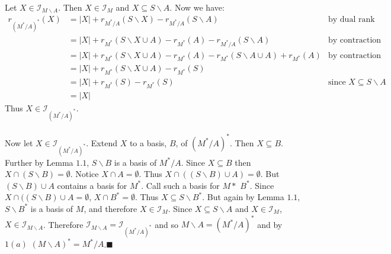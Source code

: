 \documentclass[letterpaper,12pt,oneside,onecolumn]{report}
\begin{document}
\paragraph{}
Let $X \in \mathcal{I}_{M\backslash A}$. Then $X \in \mathcal{I}_M$ and $X \subseteq S\backslash A$. Now we have:
\begin{align*}
r_{(M^*/A)^*}(X) &= |X| + r_{M^*/A}(S\backslash X) - r_{M^*/A}(S\backslash A) &\text{by dual rank}\\
&= |X| +r_{M^*}(S\backslash X \cup A) - r_{M^*}(A) - r_{M^*/A}(S\backslash A) &\text{by contraction rank}\\
&= |X| +r_{M^*}(S\backslash X \cup A) - r_{M^*}(A) - r_{M^*}(S\backslash A \cup A) + r_{M^*}(A) &\text{by contraction rank}\\
&= |X| + r_{M^*}(S\backslash X \cup A) -r_{M^*}(S)\\
&= |X| + r_{M^*}(S) - r_{M^*}(S) &\text{since $X \subseteq S\backslash A$}\\ 
&= |X|
\end{align*}
Thus $X \in \mathcal{I}_{(M^*/A)^*}$.
\paragraph{}
Now let $X \in \mathcal{I}_{(M^*/A)^*}$. Extend $X$ to a basis, $B$, of $(M^*/A)^*$. Then $X \subseteq B$. Further by Lemma $1.1$, $S\backslash B$ is a basis of $M^*/A$. Since $X \subseteq B$ then $X \cap (S\backslash B) = \emptyset$. Notice $X \cap A = \emptyset$. Thus $X \cap ((S\backslash B) \cup A) = \emptyset$. But $(S\backslash B) \cup A$ contains a basis for $M^*$. Call such a basis for $M*$ $B^*$. Since $X \cap ((S\backslash B) \cup A = \emptyset$, $X \cap B^* = \emptyset$. Thus $X \subseteq S\backslash B^*$. But again by Lemma $1.1$, $S\backslash B^*$ is a basis of $M$, and therefore $X \in \mathcal{I}_M$. Since $X \subseteq S\backslash A$ and $X \in \mathcal{I}_M$, $X \in \mathcal{I}_{M\backslash A}$. Therefore $\mathcal{I}_{M\backslash A} = \mathcal{I}_{(M^*/A)^*}$ and so $M\backslash A = (M^*/A)^*$ and by $1(a)$ $(M\backslash A)^* = M^*/A$.$\blacksquare$
\end{document}
